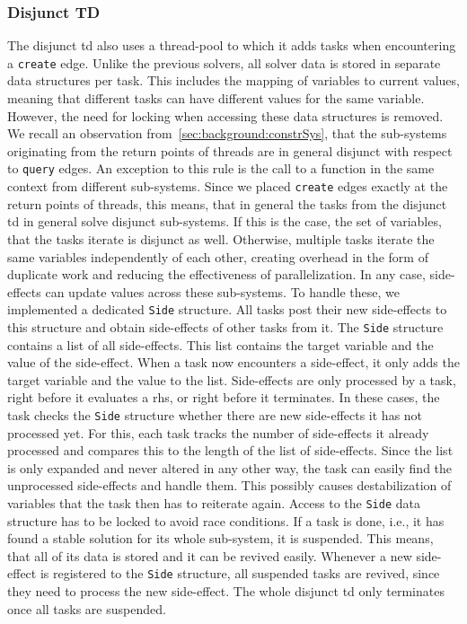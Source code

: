     \subsubsection{Disjunct TD}
    \label{sec:method:td_parallel:disjunct}
    The disjunct \ac{td} also uses a thread-pool to which it adds tasks when encountering a \texttt{create} edge. Unlike the previous solvers, all solver data is stored in separate data structures per task. This includes the mapping of variables to current values, meaning that different tasks can have different values for the same variable. However, the need for locking when accessing these data structures is removed. We recall an observation from~\autoref{sec:background:constrSys}, that the sub-systems originating from the return points of threads are in general disjunct with respect to \texttt{query} edges. An exception to this rule is the call to a function in the same context from different sub-systems. Since we placed \texttt{create} edges exactly at the return points of threads, this means, that in general the tasks from the disjunct \ac{td} in general solve disjunct sub-systems. If this is the case, the set of variables, that the tasks iterate is disjunct as well. Otherwise, multiple tasks iterate the same variables independently of each other, creating overhead in the form of duplicate work and reducing the effectiveness of parallelization.
    In any case, side-effects can update values across these sub-systems. To handle these, we implemented a dedicated \texttt{Side} structure. All tasks post their new side-effects to this structure and obtain side-effects of other tasks from it. The \texttt{Side} structure contains a list of all side-effects. This list contains the target variable and the value of the side-effect. When a task now encounters a side-effect, it only adds the target variable and the value to the list. Side-effects are only processed by a task, right before it evaluates a \ac{rhs}, or right before it terminates. In these cases, the task checks the \texttt{Side} structure whether there are new side-effects it has not processed yet. For this, each task tracks the number of side-effects it already processed and compares this to the length of the list of side-effects. Since the list is only expanded and never altered in any other way, the task can easily find the unprocessed side-effects and handle them. This possibly causes destabilization of variables that the task then has to reiterate again. Access to the \texttt{Side} data structure has to be locked to avoid race conditions.
    If a task is done, i.e., it has found a stable solution for its whole sub-system, it is suspended. This means, that all of its data is stored and it can be revived easily. Whenever a new side-effect is registered to the \texttt{Side} structure, all suspended tasks are revived, since they need to process the new side-effect. The whole disjunct \ac{td} only terminates once all tasks are suspended.
